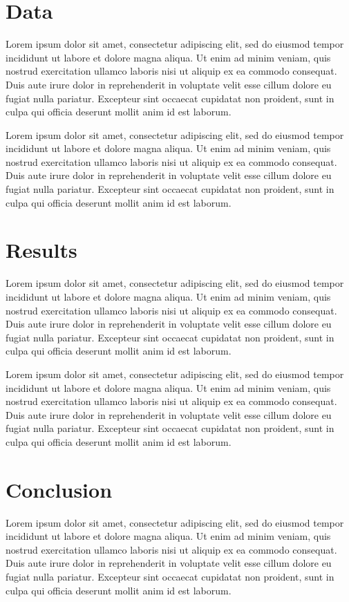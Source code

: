 \documentclass[12pt]{article}
\begin{document}
\begin{spacing}{1.4}
\section{Data} 
\label{Sec:Data}

Lorem ipsum dolor sit amet, consectetur adipiscing elit, sed do eiusmod tempor incididunt ut labore et dolore magna aliqua. Ut enim ad minim veniam, quis nostrud exercitation ullamco laboris nisi ut aliquip ex ea commodo consequat. Duis aute irure dolor in reprehenderit in voluptate velit esse cillum dolore eu fugiat nulla pariatur. Excepteur sint occaecat cupidatat non proident, sunt in culpa qui officia deserunt mollit anim id est laborum.

Lorem ipsum dolor sit amet, consectetur adipiscing elit, sed do eiusmod tempor incididunt ut labore et dolore magna aliqua. Ut enim ad minim veniam, quis nostrud exercitation ullamco laboris nisi ut aliquip ex ea commodo consequat. Duis aute irure dolor in reprehenderit in voluptate velit esse cillum dolore eu fugiat nulla pariatur. Excepteur sint occaecat cupidatat non proident, sunt in culpa qui officia deserunt mollit anim id est laborum.

\section{Results} 
\label{Sec:Results}

Lorem ipsum dolor sit amet, consectetur adipiscing elit, sed do eiusmod tempor incididunt ut labore et dolore magna aliqua. Ut enim ad minim veniam, quis nostrud exercitation ullamco laboris nisi ut aliquip ex ea commodo consequat. Duis aute irure dolor in reprehenderit in voluptate velit esse cillum dolore eu fugiat nulla pariatur. Excepteur sint occaecat cupidatat non proident, sunt in culpa qui officia deserunt mollit anim id est laborum.

Lorem ipsum dolor sit amet, consectetur adipiscing elit, sed do eiusmod tempor incididunt ut labore et dolore magna aliqua. Ut enim ad minim veniam, quis nostrud exercitation ullamco laboris nisi ut aliquip ex ea commodo consequat. Duis aute irure dolor in reprehenderit in voluptate velit esse cillum dolore eu fugiat nulla pariatur. Excepteur sint occaecat cupidatat non proident, sunt in culpa qui officia deserunt mollit anim id est laborum.

\section{Conclusion}
\label{Sec:Conclusion}

Lorem ipsum dolor sit amet, consectetur adipiscing elit, sed do eiusmod tempor incididunt ut labore et dolore magna aliqua. Ut enim ad minim veniam, quis nostrud exercitation ullamco laboris nisi ut aliquip ex ea commodo consequat. Duis aute irure dolor in reprehenderit in voluptate velit esse cillum dolore eu fugiat nulla pariatur. Excepteur sint occaecat cupidatat non proident, sunt in culpa qui officia deserunt mollit anim id est laborum.

\pagebreak{}



\end{spacing}
\end{document}
